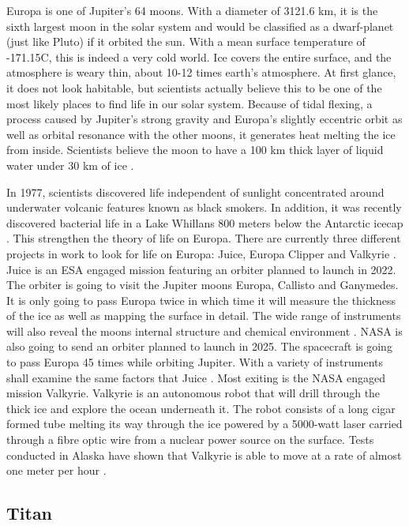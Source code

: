 Europa is one of Jupiter's 64 moons.
With a diameter of 3121.6 km, it is the sixth largest moon in the solar system and would be classified as a dwarf-planet (just like Pluto) if it orbited the sun.
With a mean surface temperature of -171.15\degree C, this is indeed a very cold world.
Ice covers the entire surface, and the atmosphere is weary thin, about 10-12 times earth's atmosphere.
At first glance, it does not look habitable, but scientists actually believe this to be one of the most likely places to find life in our solar system.
Because of tidal flexing, a process caused by Jupiter’s strong gravity and Europa’s slightly eccentric orbit as well as orbital resonance with the other moons, it generates heat melting the ice from inside.
Scientists believe the moon to have a 100 km thick layer of liquid water under 30 km of ice \cite{FPlan03} \cite{FPlan24}.
 
In 1977, scientists discovered life independent of sunlight concentrated around underwater volcanic features known as black smokers.
In addition, it was recently discovered bacterial life in a Lake Whillans 800 meters below the Antarctic icecap \cite{FPlan04}. This strengthen the theory of life on Europa.
There are currently three different projects in work to look for life on Europa: Juice, Europa Clipper and Valkyrie \cite{FPlan24}.
Juice is an ESA engaged mission featuring an orbiter planned to launch in 2022.
The orbiter is going to visit the Jupiter moons Europa, Callisto and Ganymedes.
It is only going to pass Europa twice in which time it will measure the thickness of the ice as well as mapping the surface in detail.
The wide range of instruments will also reveal the moons internal structure and chemical environment \cite{FPlan24}.
NASA is also going to send an orbiter planned to launch in 2025.
The spacecraft is going to pass Europa 45 times while orbiting Jupiter.
With a variety of instruments shall examine the same factors that Juice \cite{FPlan24}.
Most exiting is the NASA engaged mission Valkyrie.
Valkyrie is an autonomous robot that will drill through the thick ice and explore the ocean underneath it.
The robot consists of a long cigar formed tube melting its way through the ice powered by a 5000-watt laser carried through a fibre optic wire from a nuclear power source on the surface.
Tests conducted in Alaska have shown that Valkyrie is able to move at a rate of almost one meter per hour \cite{FPlan24} \cite{FPlan25}.

\subsection*{Titan}
 
